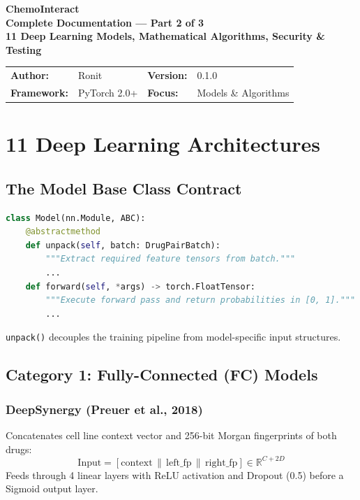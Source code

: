 \documentclass[12pt,a4paper,oneside]{article}
\begin{document}
\begin{center}
{\Huge\bfseries\color{deepblue} ChemoInteract}\\[0.3cm]
{\Large\bfseries\color{chemopurple} Complete Documentation --- Part 2 of 3}\\[0.2cm]
{\large\textbf{11 Deep Learning Models, Mathematical Algorithms, Security \& Testing}}\\[0.4cm]
\begin{tcolorbox}[enhanced,width=14cm,colback=deepblue!5,colframe=deepblue,boxrule=1pt,arc=5pt]
\centering
\begin{tabular}{llll}
\textbf{Author:} & Ronit & \textbf{Version:} & 0.1.0 \\
\textbf{Framework:} & PyTorch 2.0+ & \textbf{Focus:} & Models \& Algorithms \\
\end{tabular}
\end{tcolorbox}
\end{center}

\tableofcontents
\newpage

\section{11 Deep Learning Architectures}\label{sec:models}

\subsection{The Model Base Class Contract}

\begin{lstlisting}[language=Python]
class Model(nn.Module, ABC):
    @abstractmethod
    def unpack(self, batch: DrugPairBatch):
        """Extract required feature tensors from batch."""
        ...
    def forward(self, *args) -> torch.FloatTensor:
        """Execute forward pass and return probabilities in [0, 1]."""
        ...
\end{lstlisting}

\texttt{unpack()} decouples the training pipeline from model-specific input structures.

\subsection{Category 1: Fully-Connected (FC) Models}

\subsubsection{DeepSynergy (Preuer et al., 2018)}
Concatenates cell line context vector and 256-bit Morgan fingerprints of both drugs:
\[
\text{Input} = [\text{context} \,\|\, \text{left\_fp} \,\|\, \text{right\_fp}] \in \mathbb{R}^{C + 2D}
\]
Feeds through 4 linear layers with ReLU activation and Dropout (0.5) before a Sigmoid output layer.
\end{document}
